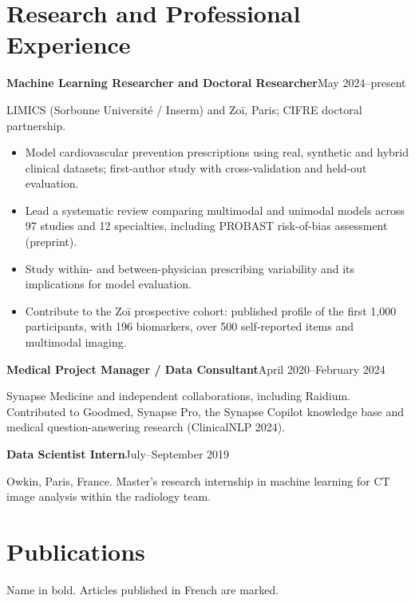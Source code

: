 \documentclass[10pt,letterpaper]{article}
\newcommand{\entry}[2]{\par\vspace{5pt}\noindent\textbf{#1}\hfill{\sffamily\small\color{muted}#2}\par\vspace{1pt}}
\begin{document}
\section{Research and Professional Experience}
\entry{Machine Learning Researcher and Doctoral Researcher}{May 2024--present}
LIMICS (Sorbonne Université / Inserm) and Zoī, Paris; CIFRE doctoral partnership.
\begin{itemize}
  \item Model cardiovascular prevention prescriptions using real, synthetic and hybrid clinical datasets; first-author study with cross-validation and held-out evaluation.
  \item Lead a systematic review comparing multimodal and unimodal models across 97 studies and 12 specialties, including PROBAST risk-of-bias assessment (preprint).
  \item Study within- and between-physician prescribing variability and its implications for model evaluation.
  \item Contribute to the Zoī prospective cohort: published profile of the first 1,000 participants, with 196 biomarkers, over 500 self-reported items and multimodal imaging.
\end{itemize}
\entry{Medical Project Manager / Data Consultant}{April 2020--February 2024}
Synapse Medicine and independent collaborations, including Raidium. Contributed to Goodmed, Synapse Pro, the Synapse Copilot knowledge base and medical question-answering research (ClinicalNLP 2024).
\entry{Data Scientist Intern}{July--September 2019}
Owkin, Paris, France. Master's research internship in machine learning for CT image analysis within the radiology team.

\section{Publications}
{\small\color{muted}Name in bold. Articles published in French are marked.}
\end{document}
